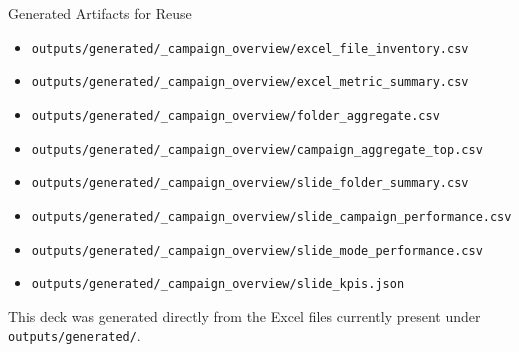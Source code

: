\documentclass[aspectratio=169]{beamer}
\begin{document}
\begin{frame}{Generated Artifacts for Reuse}
  \small
  \begin{itemize}
    \item \texttt{outputs/generated/\_campaign\_overview/excel\_file\_inventory.csv}
    \item \texttt{outputs/generated/\_campaign\_overview/excel\_metric\_summary.csv}
    \item \texttt{outputs/generated/\_campaign\_overview/folder\_aggregate.csv}
    \item \texttt{outputs/generated/\_campaign\_overview/campaign\_aggregate\_top.csv}
    \item \texttt{outputs/generated/\_campaign\_overview/slide\_folder\_summary.csv}
    \item \texttt{outputs/generated/\_campaign\_overview/slide\_campaign\_performance.csv}
    \item \texttt{outputs/generated/\_campaign\_overview/slide\_mode\_performance.csv}
    \item \texttt{outputs/generated/\_campaign\_overview/slide\_kpis.json}
  \end{itemize}

  \vspace{0.5em}
  {\footnotesize This deck was generated directly from the Excel files currently present under \texttt{outputs/generated/}.}
\end{frame}
\end{document}
